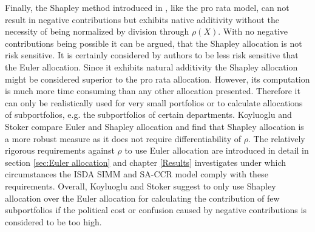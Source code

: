 \documentclass[../Thesis_AHoecherl.tex]{subfiles}
\begin{document}
Finally, the Shapley method introduced in \cite{shapley1951}, like the pro rata model, can not result in negative contributions but exhibits native additivity without the necessity of being normalized by division through $\rho(X)$.
With no negative contributions being possible it can be argued, that the Shapley allocation is not risk sensitive. It is certainly considered by authors to be less risk sensitive that the Euler allocation.
Since it exhibits natural additivity the Shapley allocation might be considered superior to the pro rata allocation. However, its computation is much more time consuming than any other allocation presented. 
Therefore it can only be realistically used for very small portfolios or to calculate allocations of subportfolios, e.g. the subportfolios of certain departments.
Koyluoglu and Stoker \cite{koyluoglu2002risk} compare Euler and Shapley allocation and find that Shapley allocation is a more robust measure as it does not require differentiability of $\rho$. The relatively rigorous requirements against $\rho$ to use Euler allocation are introduced in detail in section \ref{sec:Euler allocation} and chapter \ref{Results} investigates under which circumstances the ISDA SIMM and SA-CCR model comply with these requirements.
Overall, Koyluoglu and Stoker suggest to only use Shapley allocation over the Euler allocation for calculating the contribution of few subportfolios if the political cost or confusion caused by negative contributions is considered to be too high. 


\end{document}
